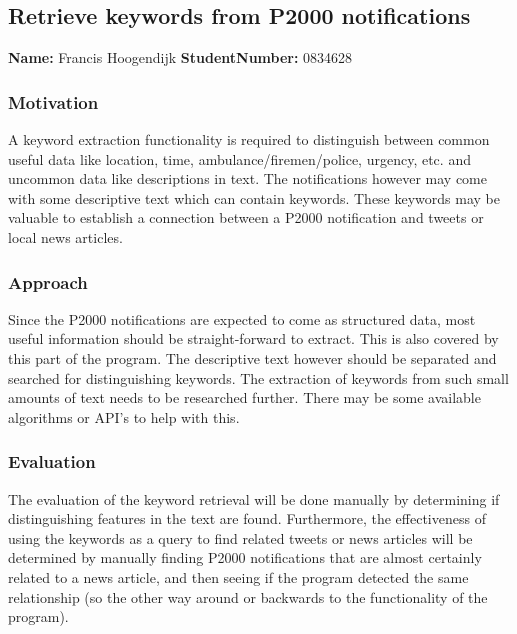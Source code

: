 \subsection*{Retrieve keywords from P2000 notifications}
\textbf{Name:} Francis Hoogendijk  \indent \textbf{StudentNumber:} 0834628

\subsubsection*{Motivation}
A keyword extraction functionality is required to distinguish between common useful data like location, time, ambulance/firemen/police, urgency, etc. and uncommon data like descriptions in text. The notifications however may come with some descriptive text which can contain keywords. These keywords may be valuable to establish a connection between a P2000 notification and tweets or local news articles. 
 
\subsubsection*{Approach}
Since the P2000 notifications are expected to come as structured data, most useful information should be straight-forward to extract. This is also covered by this part of the program. The descriptive text however should be separated and searched for distinguishing keywords. The extraction of keywords from such small amounts of text needs to be researched further. There may be some available algorithms or API's to help with this. 

\subsubsection*{Evaluation }
The evaluation of the keyword retrieval will be done manually by determining if distinguishing features in the text are found. Furthermore, the effectiveness of using the keywords as a query to find related tweets or news articles will be determined by manually finding P2000 notifications that are almost certainly related to a news article, and then seeing if the program detected the same relationship (so the other way around or backwards to the functionality of the program). 